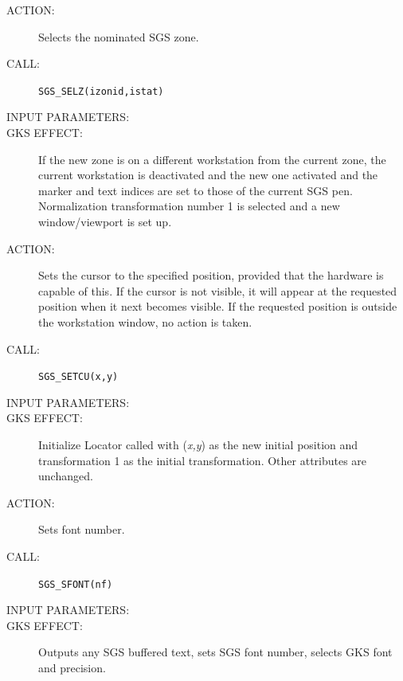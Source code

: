 \documentclass[11pt]{article}
\begin{document}
\begin{description}
\item [ACTION:]
Selects the nominated SGS zone.
\item [CALL:]
{\tt SGS\_SELZ(izonid,istat)}
\item [INPUT PARAMETERS:]
\begin{params}
\end{params}
\item [GKS EFFECT:]
If the new zone is on a different workstation from the current zone, the current
workstation is deactivated and the new one activated and the marker and text
indices are set to those of the current SGS pen.
Normalization transformation number 1 is selected and a new window/viewport is
set up.
\end{description}
\goodbreak

\begin{description}
\item [ACTION:]
Sets the cursor to the specified position, provided that the hardware is capable
of this.
If the cursor is not visible, it will appear at the requested position when it
next becomes visible.
If the requested position is outside the workstation window, no action is taken.
\item [CALL:]
{\tt SGS\_SETCU(x,y)}
\item [INPUT PARAMETERS:]
\begin{params}
\end{params}
\item [GKS EFFECT:]
Initialize Locator called with ({\em x,y}) as the new initial position and
transformation 1 as the initial transformation.
Other attributes are unchanged.
\end{description}
\goodbreak

\begin{description}
\item [ACTION:]
Sets font number.
\item [CALL:]
{\tt SGS\_SFONT(nf)}
\item [INPUT PARAMETERS:]
\begin{params}
\end{params}
\item [GKS EFFECT:]
Outputs any SGS buffered text, sets SGS font number, selects GKS font
and precision.
\end{description}
\goodbreak
\end{document}
